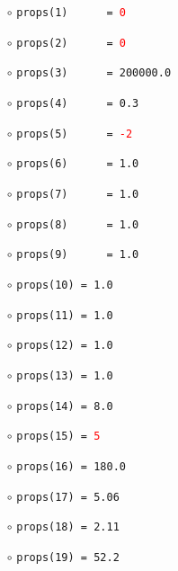 \documentclass[11pt,a4paper,twoside,final,onecolumn,titlepage]{article}
\begin{document}
\noindent
\begin{minipage}{0.4\textwidth}
	\begin{itemize}
		\item[]
		\item[$\circ$] \texttt{props(1)\,\,\,\,\,\,= \textcolor{red}{0}}
		\item[$\circ$] \texttt{props(2)\,\,\,\,\,\,= \textcolor{red}{0}}
		\item[$\circ$] \texttt{props(3)\,\,\,\,\,\,= 200000.0}
		\item[$\circ$] \texttt{props(4)\,\,\,\,\,\,= 0.3}
		\item[$\circ$] \texttt{props(5)\,\,\,\,\,\,= \textcolor{red}{-2}}
		\item[$\circ$] \texttt{props(6)\,\,\,\,\,\,= 1.0}
		\item[$\circ$] \texttt{props(7)\,\,\,\,\,\,= 1.0}
		\item[$\circ$] \texttt{props(8)\,\,\,\,\,\,= 1.0}
		\item[$\circ$] \texttt{props(9)\,\,\,\,\,\,= 1.0}
		\item[$\circ$] \texttt{props(10) = 1.0}
		\item[$\circ$] \texttt{props(11) = 1.0}
		\item[$\circ$] \texttt{props(12) = 1.0}
		\item[$\circ$] \texttt{props(13) = 1.0}
		\item[$\circ$] \texttt{props(14) = 8.0}
		\item[$\circ$] \texttt{props(15) = \textcolor{red}{5}}
		\item[$\circ$] \texttt{props(16) = 180.0}
		\item[$\circ$] \texttt{props(17) = 5.06}
		\item[$\circ$] \texttt{props(18) = 2.11}
		\item[$\circ$] \texttt{props(19) = 52.2}
	\end{itemize}
\end{minipage}
\end{document}
